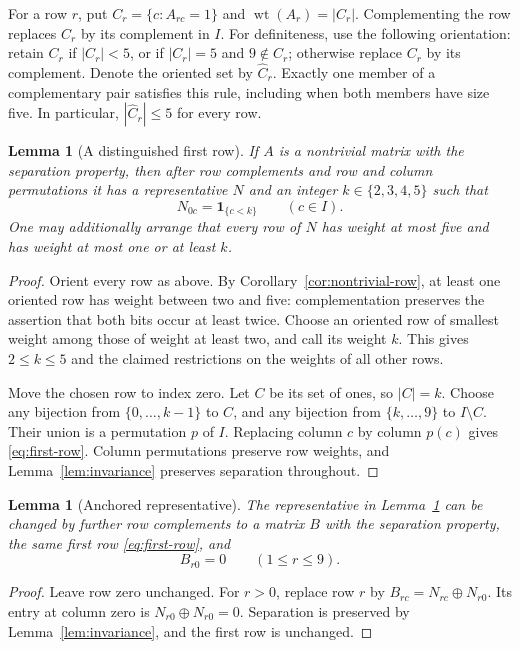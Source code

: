 \documentclass[11pt]{article}
\newtheorem{lemma}[theorem]{Lemma}
\theoremstyle{definition}
\theoremstyle{remark}
\newcommand{\I}{I}
\newcommand{\wt}{\operatorname{wt}}
\newcommand{\ind}[1]{\mathbf{1}_{\{#1\}}}
\begin{document}
For a row $r$, put $C_r=\{c:A_{rc}=1\}$ and
$\wt(A_r)=|C_r|$. Complementing the row replaces $C_r$ by its
complement in $\I$. For definiteness, use the following orientation:
retain $C_r$ if $|C_r|<5$, or if $|C_r|=5$ and $9\notin C_r$;
otherwise replace $C_r$ by its complement. Denote the oriented set by
$\widehat C_r$. Exactly one member of a complementary pair satisfies
this rule, including when both members have size five. In particular,
$|\widehat C_r|\leq5$ for every row.

\begin{lemma}[A distinguished first row]
\label{lem:first-row}
If $A$ is a nontrivial matrix with the separation property, then after
row complements and row and column permutations it has a representative
$N$ and an integer $k\in\{2,3,4,5\}$ such that
\begin{equation}
\label{eq:first-row}
 N_{0c}=\ind{c<k}\qquad(c\in\I).
\end{equation}
One may additionally arrange that every row of $N$ has weight at most
five and has weight at most one or at least $k$.
\end{lemma}
\begin{proof}
Orient every row as above. By Corollary~\ref{cor:nontrivial-row}, at
least one oriented row has weight between two and five: complementation
preserves the assertion that both bits occur at least twice. Choose an
oriented row of smallest weight among those of weight at least two, and
call its weight $k$. This gives $2\leq k\leq5$ and the claimed
restrictions on the weights of all other rows.

Move the chosen row to index zero. Let $C$ be its set of ones, so
$|C|=k$. Choose any bijection from $\{0,\ldots,k-1\}$ to $C$, and
any bijection from $\{k,\ldots,9\}$ to $\I\setminus C$. Their union
is a permutation $p$ of $\I$. Replacing column $c$ by column $p(c)$
gives \eqref{eq:first-row}. Column permutations preserve row weights,
and Lemma~\ref{lem:invariance} preserves separation throughout.
\end{proof}

\begin{lemma}[Anchored representative]
\label{lem:anchor}
The representative in Lemma~\ref{lem:first-row} can be changed by
further row complements to a matrix $B$ with the separation property,
the same first row \eqref{eq:first-row}, and
\begin{equation}
\label{eq:anchor}
 B_{r0}=0\qquad(1\leq r\leq9).
\end{equation}
\end{lemma}
\begin{proof}
Leave row zero unchanged. For $r>0$, replace row $r$ by
$B_{rc}=N_{rc}\oplus N_{r0}$. Its entry at column zero is
$N_{r0}\oplus N_{r0}=0$. Separation is preserved by
Lemma~\ref{lem:invariance}, and the first row is unchanged.
\end{proof}
\end{document}
